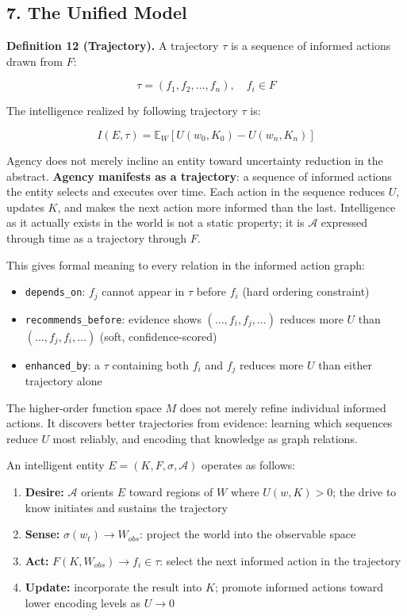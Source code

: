 \documentclass[
]{article}
\providecommand{\tightlist}{%
  \setlength{\itemsep}{0pt}\setlength{\parskip}{0pt}}
\begin{document}
\subsection{7. The Unified Model}\label{the-unified-model}

\textbf{Definition 12 (Trajectory).} A trajectory \(\tau\) is a sequence
of informed actions drawn from \(F\):

\[\tau = (f_1, f_2, \ldots, f_n), \quad f_i \in F\]

The intelligence realized by following trajectory \(\tau\) is:

\[I(E, \tau) = \mathbb{E}_W\left[U(w_0, K_0) - U(w_n, K_n)\right]\]

Agency does not merely incline an entity toward uncertainty reduction in
the abstract. \textbf{Agency manifests as a trajectory}: a sequence of
informed actions the entity selects and executes over time. Each action
in the sequence reduces \(U\), updates \(K\), and makes the next action
more informed than the last. Intelligence as it actually exists in the
world is not a static property; it is \(\mathcal{A}\) expressed through
time as a trajectory through \(F\).

This gives formal meaning to every relation in the informed action
graph:

\begin{itemize}
\tightlist
\item
  \texttt{depends\_on}: \(f_j\) cannot appear in \(\tau\) before \(f_i\)
  (hard ordering constraint)
\item
  \texttt{recommends\_before}: evidence shows
  \((\ldots, f_i, f_j, \ldots)\) reduces more \(U\) than
  \((\ldots, f_j, f_i, \ldots)\) (soft, confidence-scored)
\item
  \texttt{enhanced\_by}: a \(\tau\) containing both \(f_i\) and \(f_j\)
  reduces more \(U\) than either trajectory alone
\end{itemize}

The higher-order function space \(M\) does not merely refine individual
informed actions. It discovers better trajectories from evidence:
learning which sequences reduce \(U\) most reliably, and encoding that
knowledge as graph relations.

An intelligent entity \(E = (K, F, \sigma, \mathcal{A})\) operates as
follows:

\begin{enumerate}
\def\labelenumi{\arabic{enumi}.}
\tightlist
\item
  \textbf{Desire:} \(\mathcal{A}\) orients \(E\) toward regions of \(W\)
  where \(U(w, K) > 0\); the drive to know initiates and sustains the
  trajectory
\item
  \textbf{Sense:} \(\sigma(w_t) \rightarrow W_{obs}\): project the world
  into the observable space
\item
  \textbf{Act:} \(F(K, W_{obs}) \rightarrow f_i \in \tau\): select the
  next informed action in the trajectory
\item
  \textbf{Update:} incorporate the result into \(K\); promote informed
  actions toward lower encoding levels as \(U \rightarrow 0\)
\end{enumerate}
\end{document}
